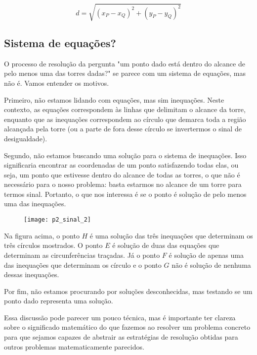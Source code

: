 $$d = \sqrt{(x_P-x_Q)^2+(y_P-y_Q)^2}$$

\subsection{Sistema de equações?}

O processo de resolução da pergunta "um ponto dado está dentro do alcance de pelo menos uma das torres dadas?" se parece com um sistema de equações, mas não é. Vamos entender os motivos.

Primeiro, não estamos lidando com equações, mas sim inequações. Neste contexto, as equações correspondem às linhas que delimitam o alcance da torre, enquanto que as inequações correspondem ao círculo que demarca toda a região alcançada pela torre (ou a parte de fora desse círculo se invertermos o sinal de desigualdade).

Segundo, não estamos buscando uma solução para o sistema de inequações. Isso significaria encontrar as coordenadas de um ponto satisfazendo todas elas, ou seja, um ponto que estivesse dentro do alcance de todas as torres, o que não é necessário para o nosso problema: basta estarmos no alcance de um torre para termos sinal. Portanto, o que nos interessa é se o ponto é solução de pelo menos uma das inequações.

\begin{figure}[H]
\centering

\texttt{[image: p2\_sinal\_2]}
\end{figure}

Na figura acima, o ponto $H$ é uma solução das três inequações que determinam os três círculos mostrados. O ponto $E$ é solução de duas das equações que determinam as circunferências traçadas. Já o ponto $F$ é solução de apenas uma das inequações que determinam os círculo e o ponto $G$ não é solução de nenhuma dessas inequações.

Por fim, não estamos procurando por soluções desconhecidas, mas testando se um ponto dado representa uma solução.

Essa discussão pode parecer um pouco técnica, mas é importante ter clareza sobre o significado matemático do que fazemos ao resolver um problema concreto para que sejamos capazes de abstrair as estratégias de resolução obtidas para outros problemas matematicamente parecidos.

